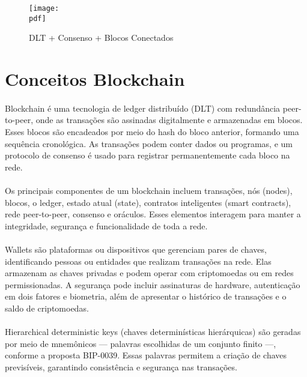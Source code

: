 \documentclass[letterpaper,11pt,leqno]{article}
\newcommand{\pdf}{figures/figures}
\begin{document}
\begin{figure}[H]
	{\texttt{[image: \\pdf]}}
	\caption{DLT + Consenso + Blocos Conectados}
	\label{f:figure2}\end{figure}

\section{Conceitos Blockchain}

\paragraph{}
Blockchain é uma tecnologia de ledger distribuído (DLT) com redundância
peer-to-peer, onde as transações são assinadas digitalmente e armazenadas em
blocos. Esses blocos são encadeados por meio do hash do bloco anterior, formando
uma sequência cronológica. As transações podem conter dados ou programas, e um
protocolo de consenso é usado para registrar permanentemente cada bloco na
rede.

\paragraph{}
Os principais componentes de um blockchain incluem transações, nós (nodes),
blocos, o ledger, estado atual (state), contratos inteligentes (smart
contracts), rede peer-to-peer, consenso e oráculos. Esses elementos interagem
para manter a integridade, segurança e funcionalidade de toda a rede.

\paragraph{}
Wallets são plataformas ou dispositivos que gerenciam pares de chaves,
identificando pessoas ou entidades que realizam transações na rede. Elas
armazenam as chaves privadas e podem operar com criptomoedas ou em redes
permissionadas. A segurança pode incluir assinaturas de hardware, autenticação
em dois fatores e biometria, além de apresentar o histórico de transações e o
saldo de criptomoedas.

\paragraph{}
Hierarchical deterministic keys (chaves determinísticas hierárquicas) são
geradas por meio de mnemônicos — palavras escolhidas de um conjunto finito —,
conforme a proposta BIP-0039. Essas palavras permitem a criação de chaves
previsíveis, garantindo consistência e segurança nas transações.
\end{document}
